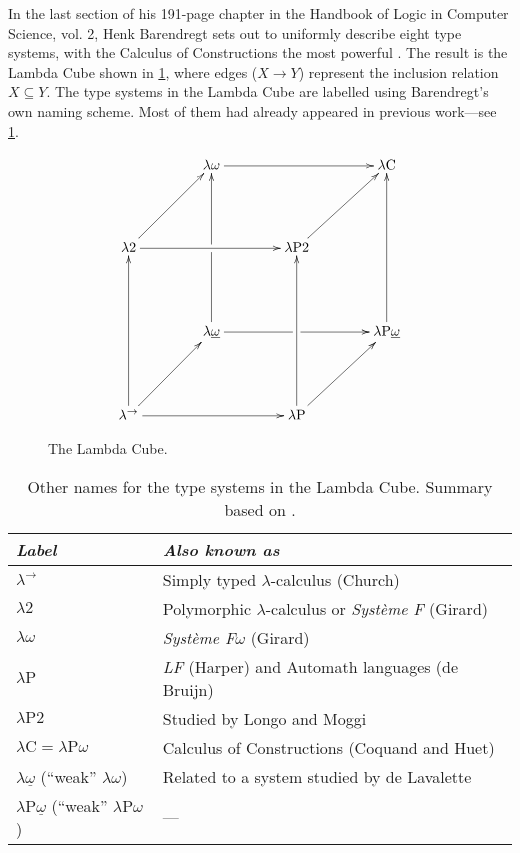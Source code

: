 \documentclass[12pt,toc=bibliography,numbers=noendperiod,
               footnotes=multiple,twoside]{scrartcl}
\begin{document}
In the last section of his 191-page chapter  in the Handbook of Logic in Computer Science, vol. 2, Henk Barendregt sets out to uniformly describe eight type systems, with the Calculus of Constructions the most powerful \autocite{barendregt_lambda_1992}. The result is the Lambda Cube shown in \cref{fig:lambda-cube}, where edges (\(X \longrightarrow Y\)) represent the inclusion relation \(X \subseteq Y\). The type systems in the Lambda Cube are labelled using Barendregt's own naming scheme. Most of them had already appeared in previous work---see \cref{tab:lambda-cube-type-systems}.

\begin{figure}
\begin{equation*}
\xymatrix@R46pt@C40pt{%
&\lambda\omega\ar@{->}[rr]&&\lambda\textrm{C} \\
\lambda\textrm{2}\ar@{->}[rr]\ar@{->}[ur]&&\lambda\textrm{P2}\ar@{->}[ur] \\
&\lambda\underline{\omega}\ar@{->}[uu]|!{"2,1";"2,3"}\hole\ar@{->}[rr]|!{"4,3";"2,3"}\hole&&\lambda\textrm{P}\underline{\omega}\ar@{->}[uu] \\
\lambda^{\rightarrow}\ar@{->}[uu]\ar@{->}[rr]\ar@{->}[ur]&&\lambda\textrm{P}\ar@{->}[uu]\ar@{->}[ur]
}
\end{equation*}
\caption{The Lambda Cube.}
\label{fig:lambda-cube}
\end{figure}

\begin{table}[h]
    \centering
    \begin{tabular}{l l}
        \toprule
        \textit{Label} & \textit{Also known as} \\
        \midrule
        \(\lambda^{\rightarrow}\) & Simply typed \(\lambda\)-calculus (Church) \\
        \(\lambda\textrm{2}\) & Polymorphic \(\lambda\)-calculus or \emph{Système F} (Girard) \\
        \(\lambda\omega\) & \emph{Système F\(\omega\)} (Girard) \\
        \(\lambda\textrm{P}\) & \emph{LF} (Harper) and Automath languages (de Bruijn) \\
        \(\lambda\textrm{P2}\) & Studied by Longo and Moggi \\
        \(\lambda\textrm{C} = \lambda\textrm{P}\omega\) & Calculus of Constructions (Coquand and Huet) \\
        \(\lambda\underline{\omega}\) (\enquote{weak} \(\lambda\omega\)) & Related to a system studied by de Lavalette \\
        \(\lambda\textrm{P}\underline{\omega}\) (\enquote{weak} \(\lambda\textrm{P}\omega\)) & --- \\
        \bottomrule
    \end{tabular}
    \caption{Other names for the type systems in the Lambda Cube. Summary based on \textcite[193]{barendregt_lambda_1992}.}
    \label{tab:lambda-cube-type-systems}
\end{table}
\end{document}
